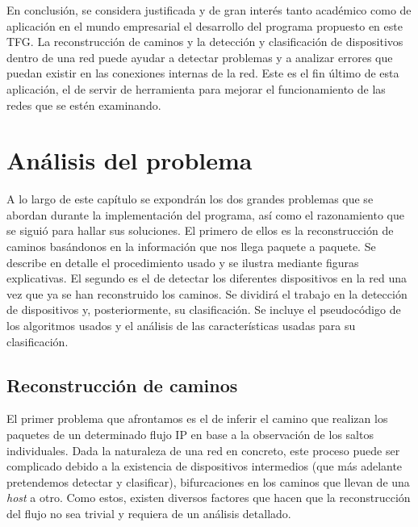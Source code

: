 \documentclass[tfg,epsbased,lof,lot,loa,final,nocopyright,overleaf]{tfgtfmthesisuam}
\begin{document}
En conclusión, se considera justificada y de gran interés tanto académico como de aplicación en el mundo empresarial el desarrollo del programa propuesto en este TFG. La reconstrucción de caminos y la detección y clasificación de dispositivos dentro de una red puede ayudar a detectar problemas y a analizar errores que puedan existir en las conexiones internas de la red. Este es el fin último de esta aplicación, el de servir de herramienta para mejorar el funcionamiento de las redes que se estén examinando.

\chapter{Análisis del problema}
\label{chap:Analisis}
A lo largo de este capítulo se expondrán los dos grandes problemas que se abordan durante la implementación del programa, así como el razonamiento que se siguió para hallar sus soluciones. El primero de ellos es la reconstrucción de caminos basándonos en la información que nos llega paquete a paquete. Se describe en detalle el procedimiento usado y se ilustra mediante figuras explicativas. El segundo es el de detectar los diferentes dispositivos en la red una vez que ya se han reconstruido los caminos. Se dividirá el trabajo en la detección de dispositivos y, posteriormente, su clasificación. Se incluye el pseudocódigo de los algoritmos usados y el análisis de las características usadas para su clasificación.

\section{Reconstrucción de caminos}
El primer problema que afrontamos es el de inferir el camino que realizan los paquetes de un determinado flujo IP en base a la observación de los saltos individuales. Dada la naturaleza de una red en concreto, este proceso puede ser complicado debido a la existencia de dispositivos intermedios (que más adelante pretendemos detectar y clasificar), bifurcaciones en los caminos que llevan de una \textit{host} a otro. Como estos, existen diversos factores que hacen que la reconstrucción del flujo no sea trivial y requiera de un análisis detallado.
\end{document}
